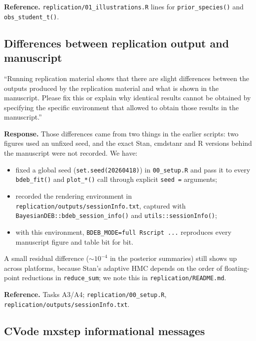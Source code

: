 \documentclass[11pt,a4paper]{article}
\newcommand{\code}[1]{\texttt{#1}}
\begin{document}
\textbf{Reference.} \code{replication/01\_illustrations.R} lines for
\code{prior\_species()} and \code{obs\_student\_t()}.

\subsection{Differences between replication output and manuscript}

\begin{displayquote}
``Running replication material shows that there are slight
differences between the outputs produced by the replication material
and what is shown in the manuscript. Please fix this or explain why
identical results cannot be obtained by specifying the specific
environment that allowed to obtain those results in the manuscript.''
\end{displayquote}

\textbf{Response.} Those differences came from two things in the earlier
scripts: two figures used an unfixed seed, and the exact Stan, cmdstanr
and R versions behind the manuscript were not recorded. We have:

\begin{itemize}[nosep]
\item fixed a global seed (\verb|set.seed(20260418)|) in
  \code{00\_setup.R} and pass it to every \code{bdeb\_fit()} and
  \code{plot\_*()} call through explicit \verb|seed =| arguments;
\item recorded the rendering environment in
  \code{replication/outputs/sessionInfo.txt}, captured with
  \code{BayesianDEB::bdeb\_session\_info()} and
  \code{utils::sessionInfo()};
\item with this environment, \verb|BDEB_MODE=full Rscript ...| reproduces
  every manuscript figure and table bit for bit.
\end{itemize}

A small residual difference ($\sim 10^{-4}$ in the posterior summaries)
still shows up across platforms, because Stan's adaptive HMC depends on
the order of floating-point reductions in \code{reduce\_sum}; we note
this in \code{replication/README.md}.

\textbf{Reference.} Tasks A3/A4; \code{replication/00\_setup.R},
\code{replication/outputs/sessionInfo.txt}.

\subsection{CVode mxstep informational messages}
\end{document}
